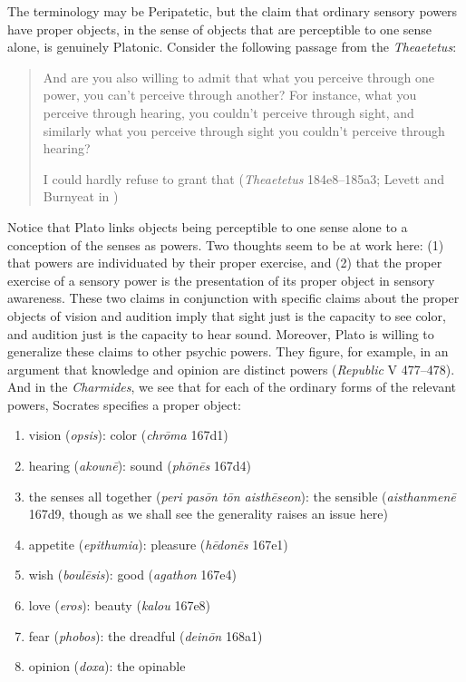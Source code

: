 The terminology may be Peripatetic, but the claim that ordinary sensory powers have proper objects, in the sense of objects that are perceptible to one sense alone, is genuinely Platonic. Consider the following passage from the \emph{Theaetetus}:
\begin{quotation}
	And are you also willing to admit that what you perceive through one power, you can't perceive through another? For instance, what you perceive through hearing, you couldn't perceive through sight, and similarly what you perceive through sight you couldn't perceive through hearing?
	
	I could hardly refuse to grant that (\emph{Theaetetus} 184e8–185a3; Levett and Burnyeat in \citealt[204]{Cooper:1997fk})
\end{quotation}
Notice that Plato links objects being perceptible to one sense alone to a conception of the senses as powers. Two thoughts seem to be at work here: (1) that powers are individuated by their proper exercise, and (2) that the proper exercise of a sensory power is the presentation of its proper object in sensory awareness. These two claims in conjunction with specific claims about the proper objects of vision and audition imply that sight just is the capacity to see color, and audition just is the capacity to hear sound. Moreover, Plato is willing to generalize these claims to other psychic powers. They figure, for example, in an argument that knowledge and opinion are distinct powers (\emph{Republic} V 477--478). And in the \emph{Charmides}, we see that for each of the ordinary forms of the relevant powers, Socrates specifies a proper object:
\begin{enumerate}[(1)]
	\item vision (\emph{opsis}): color (\emph{chrōma} 167d1)
	\item hearing (\emph{akounē}): sound (\emph{phōnēs} 167d4)
	\item the senses all together (\emph{peri pasōn tōn aisthēseon}): the sensible (\emph{aisthanmenē} 167d9, though as we shall see the generality raises an issue here)
	\item appetite (\emph{epithumia}): pleasure (\emph{hēdonēs} 167e1)
	\item wish (\emph{boulēsis}): good (\emph{agathon} 167e4)
	\item love (\emph{eros}): beauty (\emph{kalou} 167e8)
	\item fear (\emph{phobos}): the dreadful (\emph{deinōn} 168a1)
	\item opinion (\emph{doxa}): the opinable
\end{enumerate}

